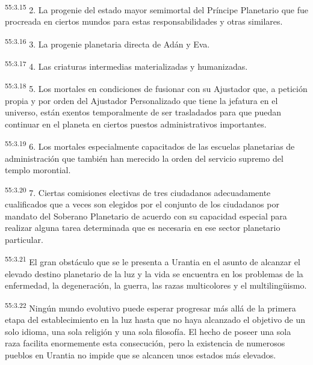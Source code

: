 \par
\textsuperscript{55:3.15} 2. La progenie del estado mayor semimortal del Príncipe Planetario que fue procreada en ciertos mundos para estas responsabilidades y otras similares.

\par
\textsuperscript{55:3.16} 3. La progenie planetaria directa de Adán y Eva.

\par
\textsuperscript{55:3.17} 4. Las criaturas intermedias materializadas y humanizadas.

\par
\textsuperscript{55:3.18} 5. Los mortales en condiciones de fusionar con su Ajustador que, a petición propia y por orden del Ajustador Personalizado que tiene la jefatura en el universo, están exentos temporalmente de ser trasladados para que puedan continuar en el planeta en ciertos puestos administrativos importantes.

\par
\textsuperscript{55:3.19} 6. Los mortales especialmente capacitados de las escuelas planetarias de administración que también han merecido la orden del servicio supremo del templo morontial.

\par
\textsuperscript{55:3.20} 7. Ciertas comisiones electivas de tres ciudadanos adecuadamente cualificados que a veces son elegidos por el conjunto de los ciudadanos por mandato del Soberano Planetario de acuerdo con su capacidad especial para realizar alguna tarea determinada que es necesaria en ese sector planetario particular.

\par
\textsuperscript{55:3.21} El gran obstáculo que se le presenta a Urantia en el asunto de alcanzar el elevado destino planetario de la luz y la vida se encuentra en los problemas de la enfermedad, la degeneración, la guerra, las razas multicolores y el multiling\"uismo.

\par
\textsuperscript{55:3.22} Ningún mundo evolutivo puede esperar progresar más allá de la primera etapa del establecimiento en la luz hasta que no haya alcanzado el objetivo de un solo idioma, una sola religión y una sola filosofía. El hecho de poseer una sola raza facilita enormemente esta consecución, pero la existencia de numerosos pueblos en Urantia no impide que se alcancen unos estados más elevados.

